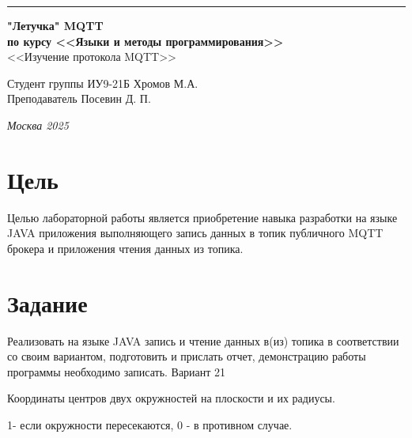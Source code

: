 \documentclass[a4paper, 14pt]{extarticle}
\begin{document}
\begin{titlepage}
\vspace*{-16pt}
\hspace{30pt}\rule{0.866\textwidth}{0.4pt}
  
\vspace{11em}

\begin{center}
\Large {\bf "Летучка" MQTT} \\ 
\large {\bf по курсу <<Языки и методы программирования>>} \\ 
\large <<Изучение протокола MQTT>>
\end{center}\normalsize

\vspace{8em}


\begin{flushright}
  {Студент группы ИУ9-21Б Хромов М.А.\hspace*{15pt} \\
  \vspace{2ex}
  Преподаватель Посевин Д. П.\hspace*{15pt}}
\end{flushright}

\bigskip

\vfill
 

\begin{center}
\textsl{Москва 2025}
\end{center}
\end{titlepage}

\renewcommand{\ttdefault}{pcr}

\setlength{\tabcolsep}{3pt}
\newpage
\section{Цель}\label{Sect::task}
\par
Целью лабораторной работы является приобретение навыка разработки на языке JAVA приложения выполняющего запись данных в топик публичного MQTT брокера и приложения чтения данных из топика.
	
 

\section{Задание}\label{Sect::task}
\par
Реализовать на языке JAVA запись и чтение данных в(из) топика в соответствии со своим вариантом, подготовить и прислать отчет, демонстрацию работы программы необходимо записать. 
Вариант 21
\par 
Координаты центров двух окружностей на плоскости и их радиусы.
\par
1- если окружности пересекаются, 0 - в противном случае.
\end{document}
